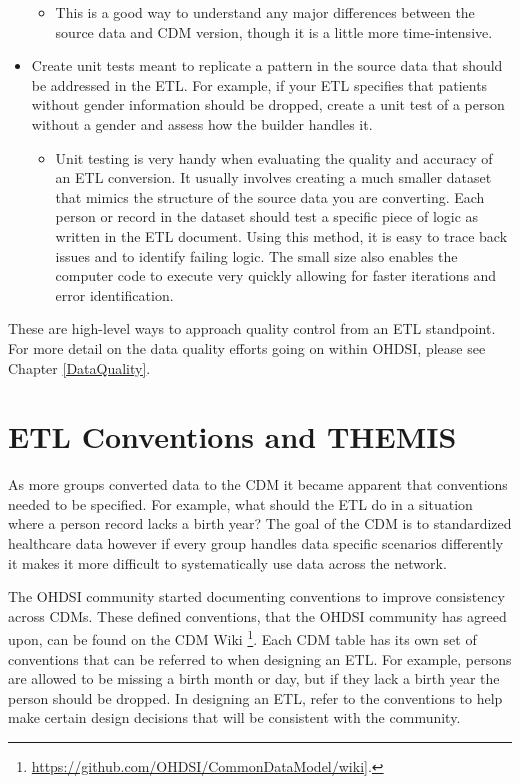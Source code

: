 \documentclass[11pt]{book}
\providecommand{\tightlist}{%
  \setlength{\itemsep}{0pt}\setlength{\parskip}{0pt}}
\let\rmarkdownfootnote\footnote%
\def\footnote{\protect\rmarkdownfootnote}
\theoremstyle{definition}
\theoremstyle{definition}
\theoremstyle{definition}
\theoremstyle{remark}
\begin{document}
\begin{itemize}
  \begin{itemize}
  \tightlist
  \item
    This is a good way to understand any major differences between the source data and CDM version, though it is a little more time-intensive.
  \end{itemize}
\item
  Create unit tests meant to replicate a pattern in the source data that should be addressed in the ETL. For example, if your ETL specifies that patients without gender information should be dropped, create a unit test of a person without a gender and assess how the builder handles it.

  \begin{itemize}
  \tightlist
  \item
    Unit testing is very handy when evaluating the quality and accuracy of an ETL conversion. It usually involves creating a much smaller dataset that mimics the structure of the source data you are converting. Each person or record in the dataset should test a specific piece of logic as written in the ETL document. Using this method, it is easy to trace back issues and to identify failing logic. The small size also enables the computer code to execute very quickly allowing for faster iterations and error identification.
  \end{itemize}
\end{itemize}

These are high-level ways to approach quality control from an ETL standpoint. For more detail on the data quality efforts going on within OHDSI, please see Chapter \ref{DataQuality}.

\hypertarget{etl-conventions-and-themis}{%
\section{ETL Conventions and THEMIS}\label{etl-conventions-and-themis}}

As more groups converted data to the CDM it became apparent that conventions needed to be specified. For example, what should the ETL do in a situation where a person record lacks a birth year? The goal of the CDM is to standardized healthcare data however if every group handles data specific scenarios differently it makes it more difficult to systematically use data across the network.

The OHDSI community started documenting conventions to improve consistency across CDMs. These defined conventions, that the OHDSI community has agreed upon, can be found on the CDM Wiki \footnote{\url{https://github.com/OHDSI/CommonDataModel/wiki}{]}.}. Each CDM table has its own set of conventions that can be referred to when designing an ETL. For example, persons are allowed to be missing a birth month or day, but if they lack a birth year the person should be dropped. In designing an ETL, refer to the conventions to help make certain design decisions that will be consistent with the community.
\end{document}
